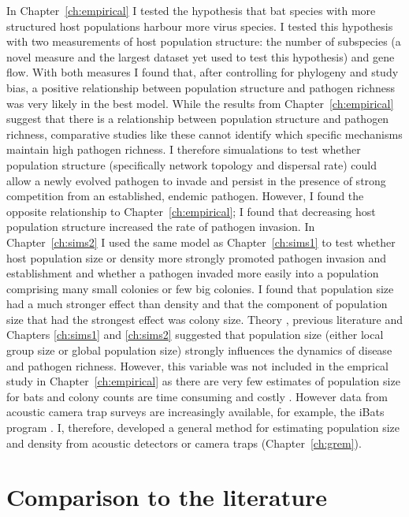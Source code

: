 In Chapter~\ref{ch:empirical} I tested the hypothesis that bat species with more structured host populations harbour more virus species.
I tested this hypothesis with two measurements of host population structure: the number of subspecies (a novel measure and the largest dataset yet used to test this hypothesis) and gene flow.
With both measures I found that, after controlling for phylogeny and study bias, a positive relationship between population structure and pathogen richness was very likely in the best model.
While the results from Chapter~\ref{ch:empirical} suggest that there is a relationship between population structure and pathogen richness, comparative studies like these cannot identify which specific mechanisms maintain high pathogen richness.
I therefore simualations to test whether population structure (specifically network topology and dispersal rate) could allow a newly evolved pathogen to invade and persist in the presence of strong competition from an established, endemic pathogen.
However, I found the opposite relationship to Chapter~\ref{ch:empirical}; I found that decreasing host population structure increased the rate of pathogen invasion.
In Chapter~\ref{ch:sims2} I used the same model as Chapter~\ref{ch:sims1} to test whether host population size or density more strongly promoted pathogen invasion and establishment and whether a pathogen invaded more easily into a population comprising many small colonies or few big colonies.
I found that population size had a much stronger effect than density and that the component of population size that had the strongest effect was colony size.
Theory \cite{may1979population, anderson1979population}, previous literature \cite{kamiya2014determines, nunn2003comparative, morand1998density} and Chapters \ref{ch:sims1} and \ref{ch:sims2} suggested that population size (either local group size or global population size) strongly influences the dynamics of disease and pathogen richness.
However, this variable was not included in the emprical study in Chapter~\ref{ch:empirical} as there are very few estimates of population size for bats and colony counts are time consuming and costly \cite{kloepper2016estimating}.
However data from acoustic camera trap surveys are increasingly available, for example, the iBats program \cite{jones2011indicator}.
I, therefore, developed a general method for estimating population size and density from acoustic detectors or camera traps (Chapter~\ref{ch:grem}).


\section{Comparison to the literature}


